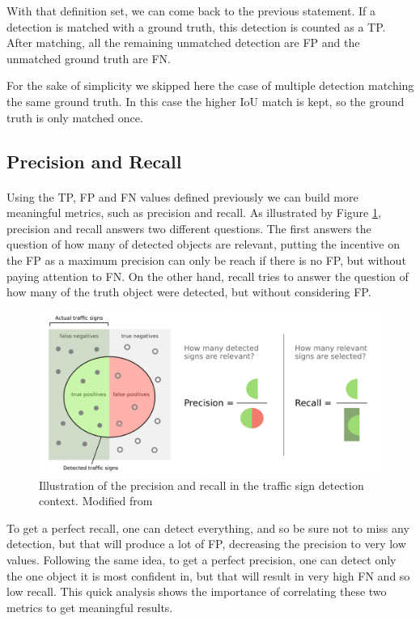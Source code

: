 With that definition set, we can come back to the previous statement. If a detection is matched with a ground truth, this detection is counted as a TP. After matching, all the remaining unmatched detection are FP and the unmatched ground truth are FN.

For the sake of simplicity we skipped here the case of multiple detection matching the same ground truth. In this case the higher IoU match is kept, so the ground truth is only matched once.

\subsection{Precision and Recall}
\paragraph{}
Using the TP, FP and FN values defined previously we can build more meaningful metrics, such as precision and recall. As illustrated by Figure \ref{fig:precisionrecall}, precision and recall answers two different questions. The first answers the question of how many of detected objects are relevant, putting the incentive on the FP as a maximum precision can only be reach if there is no FP, but without paying attention to FN. On the other hand, recall tries to answer the question of how many of the truth object were detected, but without considering FP.

\begin{figure}
    \centering
    \includegraphics[width=0.8\linewidth]{figures/precisionrecall.png}
    \caption{Illustration of the precision and recall in the traffic sign detection context. Modified from \cite{wiki:precisionrecall}}
    \label{fig:precisionrecall}
\end{figure}{}

To get a perfect recall, one can detect everything, and so be sure not to miss any detection, but that will produce a lot of FP, decreasing the precision to very low values. Following the same idea, to get a perfect precision, one can detect only the one object it is most confident in, but that will result in very high FN and so low recall. This quick analysis shows the importance of correlating these two metrics to get meaningful results.


